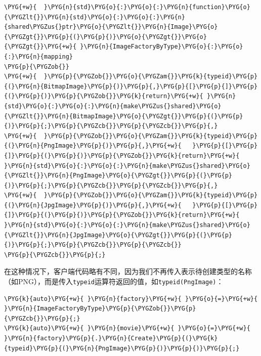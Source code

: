 \begin{codeblockbg}
\begin{Verbatim}[commandchars=\\\{\},breaklines=true,breakanywhere=true,fontsize=\codefont,xleftmargin=17bp]
\PYG{+w}{  }\PYG{n}{std}\PYG{o}{:}\PYG{o}{:}\PYG{n}{function}\PYG{o}{\PYGZlt{}}\PYG{n}{std}\PYG{o}{:}\PYG{o}{:}\PYG{n}{shared\PYGZus{}ptr}\PYG{o}{\PYGZlt{}}\PYG{n}{Image}\PYG{o}{\PYGZgt{}}\PYG{p}{(}\PYG{p}{)}\PYG{o}{\PYGZgt{}}\PYG{o}{\PYGZgt{}}\PYG{+w}{ }\PYG{n}{ImageFactoryByType}\PYG{o}{:}\PYG{o}{:}\PYG{n}{mapping}
\PYG{p}{\PYGZob{}}
\PYG{+w}{  }\PYG{p}{\PYGZob{}}\PYG{o}{\PYGZam{}}\PYG{k}{typeid}\PYG{p}{(}\PYG{n}{BitmapImage}\PYG{p}{)}\PYG{p}{,}\PYG{p}{[}\PYG{p}{]}\PYG{p}{(}\PYG{p}{)}\PYG{p}{\PYGZob{}}\PYG{k}{return}\PYG{+w}{ }\PYG{n}{std}\PYG{o}{:}\PYG{o}{:}\PYG{n}{make\PYGZus{}shared}\PYG{o}{\PYGZlt{}}\PYG{n}{BitmapImage}\PYG{o}{\PYGZgt{}}\PYG{p}{(}\PYG{p}{)}\PYG{p}{;}\PYG{p}{\PYGZcb{}}\PYG{p}{\PYGZcb{}}\PYG{p}{,}
\PYG{+w}{  }\PYG{p}{\PYGZob{}}\PYG{o}{\PYGZam{}}\PYG{k}{typeid}\PYG{p}{(}\PYG{n}{PngImage}\PYG{p}{)}\PYG{p}{,}\PYG{+w}{   }\PYG{p}{[}\PYG{p}{]}\PYG{p}{(}\PYG{p}{)}\PYG{p}{\PYGZob{}}\PYG{k}{return}\PYG{+w}{ }\PYG{n}{std}\PYG{o}{:}\PYG{o}{:}\PYG{n}{make\PYGZus{}shared}\PYG{o}{\PYGZlt{}}\PYG{n}{PngImage}\PYG{o}{\PYGZgt{}}\PYG{p}{(}\PYG{p}{)}\PYG{p}{;}\PYG{p}{\PYGZcb{}}\PYG{p}{\PYGZcb{}}\PYG{p}{,}
\PYG{+w}{  }\PYG{p}{\PYGZob{}}\PYG{o}{\PYGZam{}}\PYG{k}{typeid}\PYG{p}{(}\PYG{n}{JpgImage}\PYG{p}{)}\PYG{p}{,}\PYG{+w}{   }\PYG{p}{[}\PYG{p}{]}\PYG{p}{(}\PYG{p}{)}\PYG{p}{\PYGZob{}}\PYG{k}{return}\PYG{+w}{ }\PYG{n}{std}\PYG{o}{:}\PYG{o}{:}\PYG{n}{make\PYGZus{}shared}\PYG{o}{\PYGZlt{}}\PYG{n}{JpgImage}\PYG{o}{\PYGZgt{}}\PYG{p}{(}\PYG{p}{)}\PYG{p}{;}\PYG{p}{\PYGZcb{}}\PYG{p}{\PYGZcb{}}
\PYG{p}{\PYGZcb{}}\PYG{p}{;}
\end{Verbatim}
\end{codeblockbg}



在这种情况下，客户端代码略有不同，因为我们不再传入表示待创建类型的名称（如PNG），而是传入\texttt{typeid}运算符返回的值，如\texttt{typeid(\allowbreak{}PngImage)}：



\begin{codeblockbg}
\begin{Verbatim}[commandchars=\\\{\},breaklines=true,breakanywhere=true,fontsize=\codefont,xleftmargin=17bp]
\PYG{k}{auto}\PYG{+w}{ }\PYG{n}{factory}\PYG{+w}{ }\PYG{o}{=}\PYG{+w}{ }\PYG{n}{ImageFactoryByType}\PYG{p}{\PYGZob{}}\PYG{p}{\PYGZcb{}}\PYG{p}{;}
\PYG{k}{auto}\PYG{+w}{ }\PYG{n}{movie}\PYG{+w}{ }\PYG{o}{=}\PYG{+w}{ }\PYG{n}{factory}\PYG{p}{.}\PYG{n}{Create}\PYG{p}{(}\PYG{k}{typeid}\PYG{p}{(}\PYG{n}{PngImage}\PYG{p}{)}\PYG{p}{)}\PYG{p}{;}
\end{Verbatim}
\end{codeblockbg}



